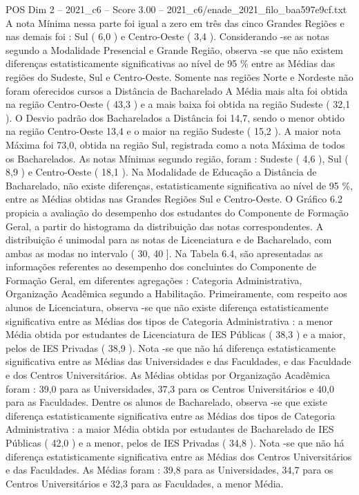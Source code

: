 \begin{textsample}{POS Dim 2 – 2021\_c6 – Score 3.00 – 2021\_c6/enade\_2021\_filo\_baa597e9cf.txt}
A nota Mínima nessa parte foi igual a zero em três das cinco Grandes Regiões e nas demais foi : Sul ( 6,0 ) e Centro-Oeste ( 3,4 ).
Considerando -se as notas segundo a Modalidade Presencial e Grande Região, observa -se que não existem diferenças estatisticamente significativas ao nível de 95 \% entre as Médias das regiões do Sudeste, Sul e Centro-Oeste.
Somente nas regiões Norte e Nordeste não foram oferecidos cursos a Distância de Bacharelado A Média mais alta foi obtida na região Centro-Oeste ( 43,3 ) e a mais baixa foi obtida na região Sudeste ( 32,1 ).
O Desvio padrão dos Bacharelados a Distância foi 14,7, sendo o menor obtido na região Centro-Oeste 13,4 e o maior na região Sudeste ( 15,2 ).
A maior nota Máxima foi 73,0, obtida na região Sul, registrada como a nota Máxima de todos os Bacharelados.
As notas Mínimas segundo região, foram : Sudeste ( 4,6 ), Sul ( 8,9 ) e Centro-Oeste ( 18,1 ).
Na Modalidade de Educação a Distância de Bacharelado, não existe diferenças, estatisticamente significativa ao nível de 95 \%, entre as Médias obtidas nas Grandes Regiões Sul e Centro-Oeste.
O Gráfico 6.2 propicia a avaliação do desempenho dos estudantes do Componente de Formação Geral, a partir do histograma da distribuição das notas correspondentes.
A distribuição é unimodal para as notas de Licenciatura e de Bacharelado, com ambas as modas no intervalo ( 30, 40 ].
Na Tabela 6.4, são apresentadas as informações referentes ao desempenho dos concluintes do Componente de Formação Geral, em diferentes agregações : Categoria Administrativa, Organização Acadêmica segundo a Habilitação.
Primeiramente, com respeito aos alunos de Licenciatura, observa -se que não existe diferença estatisticamente significativa entre as Médias dos tipos de Categoria Administrativa : a menor Média obtida por estudantes de Licenciatura de IES Públicas ( 38,3 ) e a maior, pelos de IES Privadas ( 38,9 ).
Nota -se que não há diferença estatisticamente significativa entre as Médias das Universidades e das Faculdades, e das Faculdade e dos Centros Universitários.
As Médias obtidas por Organização Acadêmica foram : 39,0 para as Universidades, 37,3 para os Centros Universitários e 40,0 para as Faculdades.
Dentre os alunos de Bacharelado, observa -se que existe diferença estatisticamente significativa entre as Médias dos tipos de Categoria Administrativa : a maior Média obtida por estudantes de Bacharelado de IES Públicas ( 42,0 ) e a menor, pelos de IES Privadas ( 34,8 ).
Nota -se que não há diferença estatisticamente significativa entre as Médias dos Centros Universitários e das Faculdades.
As Médias foram : 39,8 para as Universidades, 34,7 para os Centros Universitários e 32,3 para as Faculdades, a menor Média.

\end{textsample}

